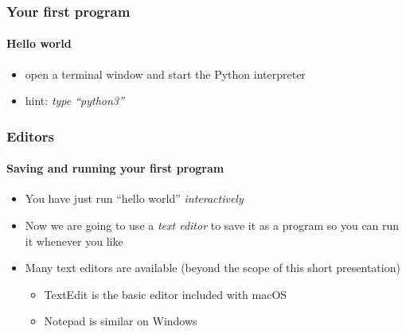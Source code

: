 \documentclass{beamer}
\begin{document}



    \begin{frame}
	    \frametitle{Your first program}
	    \framesubtitle{Hello world}

	    \begin{itemize}
		    \item open a terminal window and start the Python interpreter
		    \item hint: \textit{type ``python3''}
	    \end{itemize}
	    \lstB
	    \lstC
    \end{frame}


    \begin{frame}
	    \frametitle{Editors}
	    \framesubtitle{Saving and running your first program}

	    \begin{itemize}
		    \item You have just run ``hello world'' \textit{interactively}
		    \item Now we are going to use a \textit{text editor} to save it as a program so you can run it whenever you like
		    \item Many text editors are available (beyond the scope of this short presentation)
			    \begin{itemize}
		    \item TextEdit is the basic editor included with macOS
		    \item Notepad is similar on Windows
			    \end{itemize}
	    \end{itemize}
    \end{frame}
\end{document}
